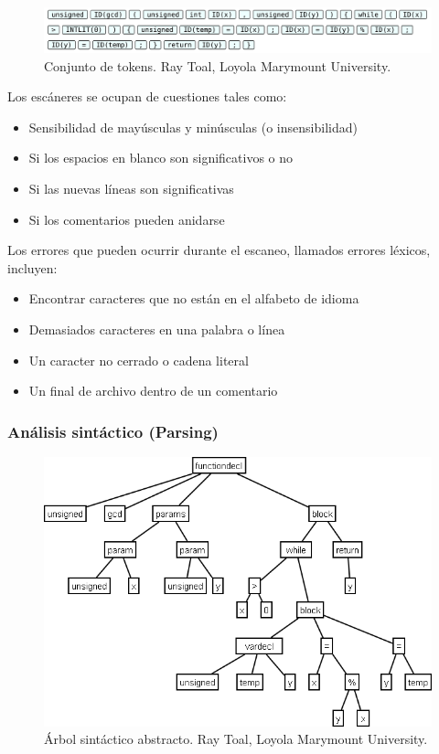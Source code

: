 \begin{figure}[h]
    \centering
    \includegraphics[scale=0.2]{images/tokens.png}
    \caption{Conjunto de tokens. Ray Toal, Loyola Marymount University.}
    \label{fig:tokens}
\end{figure}

Los escáneres se ocupan de cuestiones tales como:
\begin{itemize}
    \item Sensibilidad de mayúsculas y minúsculas (o insensibilidad)
    \item Si los espacios en blanco son significativos o no
    \item Si las nuevas líneas son significativas
    \item Si los comentarios pueden anidarse
\end{itemize}

Los errores que pueden ocurrir durante el escaneo, llamados errores léxicos, incluyen:
\begin{itemize}
    \item Encontrar caracteres que no están en el alfabeto de idioma
    \item Demasiados caracteres en una palabra o línea
    \item Un caracter no cerrado o cadena literal
    \item Un final de archivo dentro de un comentario
\end{itemize}

\subsubsection{Análisis sintáctico (Parsing)}

\begin{figure}[h]
    \centering
    \includegraphics[scale=0.3]{images/gcdast1.png}
    \caption{Árbol sintáctico abstracto. Ray Toal, Loyola Marymount University.}
    \label{fig:ast}
\end{figure}

